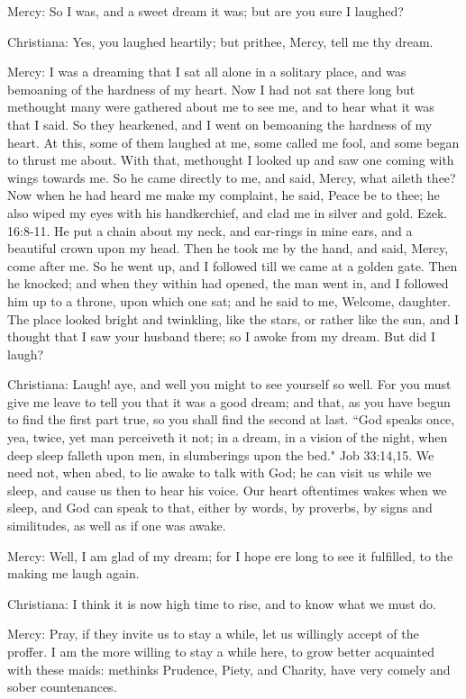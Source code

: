 Mercy: So I was, and a sweet dream it was; but are you sure I laughed?

Christiana: Yes, you laughed heartily; but prithee, Mercy, tell me thy dream.

Mercy: I was a dreaming that I sat all alone in a solitary place, and was bemoaning of the hardness of my heart. Now I had not sat there long but methought many were gathered about me to see me, and to hear what it was that I said. So they hearkened, and I went on bemoaning the hardness of my heart. At this, some of them laughed at me, some called me fool, and some began to thrust me about. With that, methought I looked up and saw one coming with wings towards me. So he came directly to me, and said, Mercy, what aileth thee? Now when he had heard me make my complaint, he said, Peace be to thee; he also wiped my eyes with his handkerchief, and clad me in silver and gold. Ezek. 16:8-11. He put a chain about my neck, and ear-rings in mine ears, and a beautiful crown upon my head. Then he took me by the hand, and said, Mercy, come after me. So he went up, and I followed till we came at a golden gate. Then he knocked; and when they within had opened, the man went in, and I followed him up to a throne, upon which one sat; and he said to me, Welcome, daughter. The place looked bright and twinkling, like the stars, or rather like the sun, and I thought that I saw your husband there; so I awoke from my dream. But did I laugh?

Christiana: Laugh! aye, and well you might to see yourself so well. For you must give me leave to tell you that it was a good dream; and that, as you have begun to find the first part true, so you shall find the second at last. ``God speaks once, yea, twice, yet man perceiveth it not; in a dream, in a vision of the night, when deep sleep falleth upon men, in slumberings upon the bed." Job 33:14,15. We need not, when abed, to lie awake to talk with God; he can visit us while we sleep, and cause us then to hear his voice. Our heart oftentimes wakes when we sleep, and God can speak to that, either by words, by proverbs, by signs and similitudes, as well as if one was awake.

Mercy: Well, I am glad of my dream; for I hope ere long to see it fulfilled, to the making me laugh again.

Christiana: I think it is now high time to rise, and to know what we must do.

Mercy: Pray, if they invite us to stay a while, let us willingly accept of the proffer. I am the more willing to stay a while here, to grow better acquainted with these maids: methinks Prudence, Piety, and Charity, have very comely and sober countenances.

